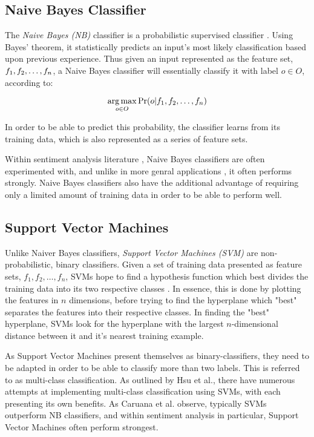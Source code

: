 \subsection{Naive Bayes Classifier}

The \emph{Naive Bayes (NB)} classifier is a probabilistic supervised classifier \cite{Rish:2001vu}. Using Bayes' theorem, it statistically predicts an input's most likely classification based upon previous experience. Thus given an input represented as the feature set, $f_1, f_2,\-\dots\-,f_n$, a Naive Bayes classifier will essentially classify it with label $o \in O$, according to:

\begin{equation}
	\operatorname*{arg\,max}_{o \in O} \Pr(o | f_1, f_2,\dots,f_n)
\end{equation}

In order to be able to predict this probability, the classifier learns from its training data, which is also represented as a series of feature sets. 

Within sentiment analysis literature \cite{Pang:2008wj,Liu:2010tm}, Naive Bayes classifiers are often experimented with, and unlike in more genral applications \cite{ChihWeiHsu:2002gr}, it often performs strongly. Naive Bayes classifiers also have the additional advantage of requiring only a limited amount of training data in order to be able to perform well.

\subsection{Support Vector Machines}

Unlike Naiver Bayes classifiers, \emph{Support Vector Machines (SVM)} are non-probabilistic, binary classifiers. Given a set of training data presented as feature sets, $f_1, f_2,\dots,f_n$, SVMs hope to find a hypothesis function which best divides the training data into its two respective classes \cite{Lin:2004th}. In essence, this is done by plotting the features in $n$ dimensions, before trying to find the hyperplane which "best" separates the features into their respective classes. In finding the "best" hyperplane, SVMs look for the hyperplane with the largest $n$-dimensional distance between it and it's nearest training example.

As Support Vector Machines present themselves as binary-classifiers, they need to be adapted in order to be able to classify more than two labels. This is referred to as multi-class classification. As outlined by Hsu et al., there have numerous attempts at implementing multi-class classification using SVMs, with each presenting its own benefits. As Caruana et al. observe, typically SVMs outperform NB classifiers, and within sentiment analysis \cite{Pang:2008wj,Liu:2010tm} in particular, Support Vector Machines often perform strongest.

